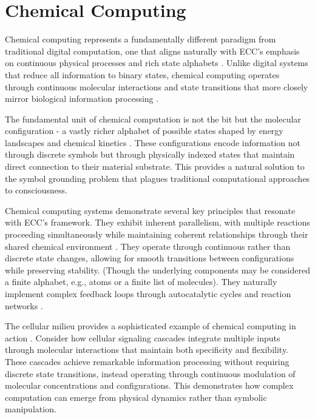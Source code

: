 \section{Chemical Computing}

Chemical computing represents a fundamentally different paradigm from traditional digital computation, one that aligns naturally with ECC's emphasis on continuous physical processes and rich state alphabets \cite{Adamatzky2021}. Unlike digital systems that reduce all information to binary states, chemical computing operates through continuous molecular interactions and state transitions that more closely mirror biological information processing \cite{Benenson2019}.

The fundamental unit of chemical computation is not the bit but the molecular configuration - a vastly richer alphabet of possible states shaped by energy landscapes and chemical kinetics \cite{Dittrich2018}. These configurations encode information not through discrete symbols but through physically indexed states that maintain direct connection to their material substrate. This provides a natural solution to the symbol grounding problem that plagues traditional computational approaches to consciousness.

Chemical computing systems demonstrate several key principles that resonate with ECC's framework. They exhibit inherent parallelism, with multiple reactions proceeding simultaneously while maintaining coherent relationships through their shared chemical environment \cite{Hjelmfelt1991}. They operate through continuous rather than discrete state changes, allowing for smooth transitions between configurations while preserving stability. (Though the underlying components may be considered a finite alphabet, e.g., atoms or a finite list of molecules). They naturally implement complex feedback loops through autocatalytic cycles and reaction networks \cite{Katz2012}.

The cellular milieu provides a sophisticated example of chemical computing in action \cite{Lehn2013}. Consider how cellular signaling cascades integrate multiple inputs through molecular interactions that maintain both specificity and flexibility. These cascades achieve remarkable information processing without requiring discrete state transitions, instead operating through continuous modulation of molecular concentrations and configurations. This demonstrates how complex computation can emerge from physical dynamics rather than symbolic manipulation.

